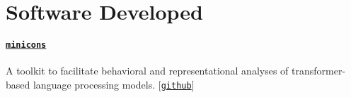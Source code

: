 \documentclass[11pt]{article}
\newcommand{\github}[1]{[\href{#1}{\texttt{github}}]}
\begin{document}
\section*{Software Developed}
\paragraph{\href{https://pypi.org/project/minicons/}{\texttt{minicons}}} A toolkit to facilitate behavioral and representational analyses of transformer-based language processing models. \github{https://github.com/kanishkamisra/minicons}



\end{document}
